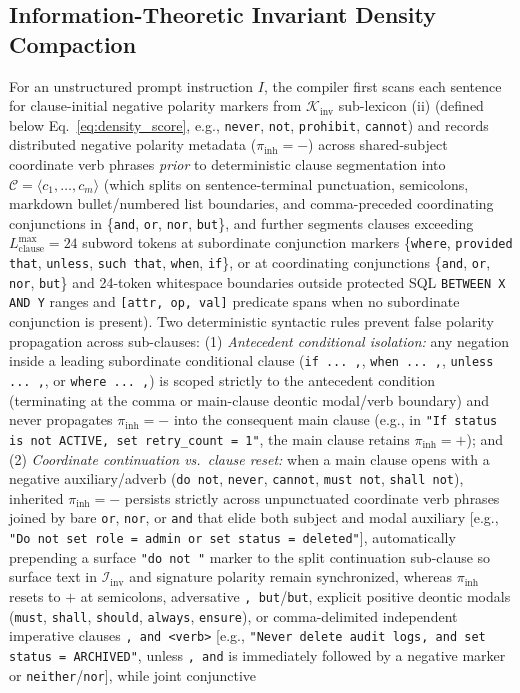 \documentclass[conference,10pt]{IEEEtran}
\begin{document}
\subsection{Information-Theoretic Invariant Density Compaction}
For an unstructured prompt instruction $I$, the compiler first scans each sentence for clause-initial negative polarity markers from $\mathcal{K}_{\text{inv}}$ sub-lexicon (ii) (defined below Eq.~\ref{eq:density_score}, e.g., \texttt{never}, \texttt{not}, \texttt{prohibit}, \texttt{cannot}) and records distributed negative polarity metadata ($\pi_{\text{inh}} = -$) across shared-subject coordinate verb phrases \textit{prior} to deterministic clause segmentation into $\mathcal{C} = \langle c_1, \dots, c_m \rangle$ (which splits on sentence-terminal punctuation, semicolons, markdown bullet/numbered list boundaries, and comma-preceded coordinating conjunctions in \{\texttt{and}, \texttt{or}, \texttt{nor}, \texttt{but}\}, and further segments clauses exceeding $L_{\text{clause}}^{\max} = 24$ subword tokens at subordinate conjunction markers \{\texttt{where}, \texttt{provided that}, \texttt{unless}, \texttt{such that}, \texttt{when}, \texttt{if}\}, or at coordinating conjunctions \{\texttt{and}, \texttt{or}, \texttt{nor}, \texttt{but}\} and 24-token whitespace boundaries outside protected SQL \texttt{BETWEEN X AND Y} ranges and \texttt{[attr, op, val]} predicate spans when no subordinate conjunction is present). Two deterministic syntactic rules prevent false polarity propagation across sub-clauses: (1) \textit{Antecedent conditional isolation:} any negation inside a leading subordinate conditional clause (\texttt{if ... ,}, \texttt{when ... ,}, \texttt{unless ... ,}, or \texttt{where ... ,}) is scoped strictly to the antecedent condition (terminating at the comma or main-clause deontic modal/verb boundary) and never propagates $\pi_{\text{inh}} = -$ into the consequent main clause (e.g., in \texttt{"If status is not \textquotesingle ACTIVE\textquotesingle, set retry\_count = 1"}, the main clause retains $\pi_{\text{inh}} = +$); and (2) \textit{Coordinate continuation vs.\ clause reset:} when a main clause opens with a negative auxiliary/adverb (\texttt{do not}, \texttt{never}, \texttt{cannot}, \texttt{must not}, \texttt{shall not}), inherited $\pi_{\text{inh}} = -$ persists strictly across unpunctuated coordinate verb phrases joined by bare \texttt{or}, \texttt{nor}, or \texttt{and} that elide both subject and modal auxiliary [e.g., \texttt{"Do not set role = \textquotesingle admin\textquotesingle\ or set status = \textquotesingle deleted\textquotesingle"}], automatically prepending a surface \texttt{"do not "} marker to the split continuation sub-clause so surface text in $\mathcal{I}_{\text{inv}}$ and signature polarity remain synchronized, whereas $\pi_{\text{inh}}$ resets to $+$ at semicolons, adversative \texttt{, but}/\texttt{but}, explicit positive deontic modals (\texttt{must}, \texttt{shall}, \texttt{should}, \texttt{always}, \texttt{ensure}), or comma-delimited independent imperative clauses \texttt{, and <verb>} [e.g., \texttt{"Never delete audit logs, and set status = \textquotesingle ARCHIVED\textquotesingle"}, unless \texttt{, and} is immediately followed by a negative marker or \texttt{neither}/\texttt{nor}], while joint conjunctive 
\end{document}

